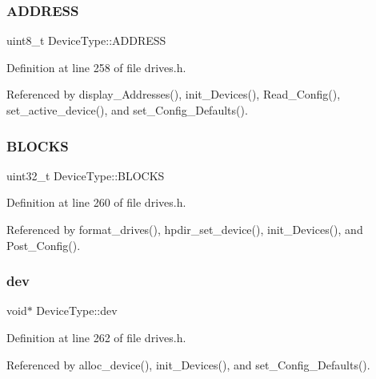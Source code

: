\subsubsection{\texorpdfstring{A\+D\+D\+R\+E\+SS}{ADDRESS}}
{\footnotesize\ttfamily uint8\+\_\+t Device\+Type\+::\+A\+D\+D\+R\+E\+SS}



Definition at line 258 of file drives.\+h.



Referenced by display\+\_\+\+Addresses(), init\+\_\+\+Devices(), Read\+\_\+\+Config(), set\+\_\+active\+\_\+device(), and set\+\_\+\+Config\+\_\+\+Defaults().

\mbox{\label{structDeviceType_a29cbf84a3e9c8d01c8c77023ebf9c1f5}} 
\subsubsection{\texorpdfstring{B\+L\+O\+C\+KS}{BLOCKS}}
{\footnotesize\ttfamily uint32\+\_\+t Device\+Type\+::\+B\+L\+O\+C\+KS}



Definition at line 260 of file drives.\+h.



Referenced by format\+\_\+drives(), hpdir\+\_\+set\+\_\+device(), init\+\_\+\+Devices(), and Post\+\_\+\+Config().

\mbox{\label{structDeviceType_a59fc3b3cb45f8ee0cd1016bd64804d3b}} 
\subsubsection{\texorpdfstring{dev}{dev}}
{\footnotesize\ttfamily void$\ast$ Device\+Type\+::dev}



Definition at line 262 of file drives.\+h.



Referenced by alloc\+\_\+device(), init\+\_\+\+Devices(), and set\+\_\+\+Config\+\_\+\+Defaults().

\mbox{\label{structDeviceType_a47798e475b578d09f024fd983c69dfb6}} 

